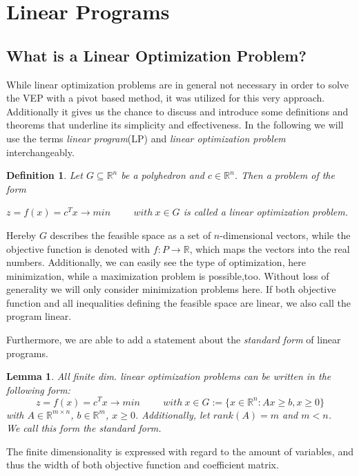 \documentclass[a4paper, 11pt]{article}
\makeatletter
\newtheorem{mydef}{Definition}
\newtheorem{lemma}{Lemma}
\renewenvironment{quotation}
{\list{}{\listparindent=1.5em
		\itemindent=0pt
		\parsep\z@ \@plus\p@}%
	\item\relax}
{\endlist}
\makeatother
\begin{document}
\section{Linear Programs}
\subsection{What is a Linear Optimization Problem?}
While linear optimization problems are in general not necessary in order to solve the VEP with a pivot based method, it was utilized for this very approach. Additionally it gives us the chance to discuss and introduce some definitions and theorems that underline its simplicity and effectiveness. In the following we will use the terms \textit{linear program}(LP) and \textit{linear optimization problem} interchangeably.\medskip

\begin{mydef}
	Let $ G \subseteq \mathbb{R}^n$ be a polyhedron and $ c \in \mathbb{R}^n$. Then a problem of the form \medskip
	\vspace{0.15cm}
	\begin{quotation}
		$ z = f(x) = c^Tx \rightarrow min\hspace{1cm} with\ x \in G$
	\end{quotation} 
	is called a \emph{linear} optimization problem.
\end{mydef}

Hereby $G$ describes the feasible space as a set of $n$-dimensional vectors, while the objective function is denoted with $f:P\rightarrow\mathbb{R}$, which maps the vectors into the real numbers. Additionally, we can easily see the type of optimization, here minimization, while a maximization problem is possible,too. Without loss of generality we will only consider minimization problems here. If both objective function and all inequalities defining the feasible space are linear, we also call the program linear. \medskip

Furthermore, we are able to add a statement about the \textit{standard form} of linear programs. \medskip
\begin{lemma}\cite{introtoAlg}
	All finite dim. linear optimization problems can be written in the following form:\medskip
	\begin{equation}
		\label{standardform}
		z = f(x) = c^T x \rightarrow min \hspace{1cm} with\ x \in G:=\{x \in \mathbb{R}^n: Ax \geq b, x \geq 0\}
	\end{equation}
	with $A\in \mathbb{R}^{m\times n}$, $b\in\mathbb{R}^m$, $x\geq 0$.	Additionally, let $rank(A)=m$ and $m< n$.\\
	We call this form the \textit{standard form}.
\end{lemma}
The finite dimensionality is expressed with regard to the amount of variables, and thus the width of both objective function and coefficient matrix. \medskip
\end{document}
